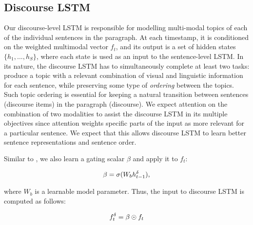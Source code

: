 \documentclass[11pt,a4paper]{article}
\begin{document}

\subsection{Discourse LSTM}
Our discourse-level LSTM is responsible for modelling multi-modal topics of each of the individual sentences in the paragraph.
At each timestamp, it is conditioned on the weighted multimodal vector $f_t$, and its output is a set of hidden states $\{h_1, ..., h_S\}$, where each state is used as an input to the sentence-level LSTM.
In its nature, the discourse LSTM has to simultaneously complete at least two tasks: produce a topic with a relevant combination of visual and linguistic information for each sentence, while preserving some type of \textit{ordering} between the topics.
Such topic ordering is essential for keeping a natural transition between sentences (discourse items) in the paragraph (discourse).
We expect attention on the combination of two modalities to assist the discourse LSTM in its multiple objectives since attention weights specific parts of the input as more relevant for a particular sentence.
We expect that this allows discourse LSTM to learn better sentence representations and sentence order.

Similar to \cite{xu2015attend}, we also learn a gating scalar $\beta$ and apply it to $f_t$:

\begin{equation}
	\beta = \sigma(W_b h\sp{\delta}_{t-1}),
\end{equation}

where $W_b$ is a learnable model parameter.
Thus, the input to discourse LSTM is computed as follows:

\begin{equation}
	f_t\sp\delta = \beta \odot f_t
\end{equation}

\end{document}
